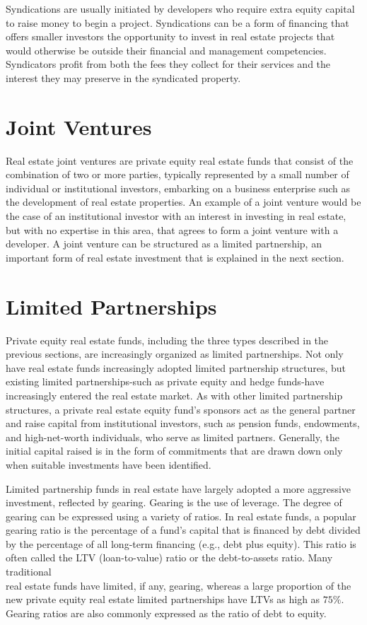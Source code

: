 \documentclass[11pt]{article}
\begin{document}
Syndications are usually initiated by developers who require extra equity capital to raise money to begin a project. Syndications can be a form of financing that offers smaller investors the opportunity to invest in real estate projects that would otherwise be outside their financial and management competencies. Syndicators profit from both the fees they collect for their services and the interest they may preserve in the syndicated property.

\section*{Joint Ventures}
Real estate joint ventures are private equity real estate funds that consist of the combination of two or more parties, typically represented by a small number of individual or institutional investors, embarking on a business enterprise such as the development of real estate properties. An example of a joint venture would be the case of an institutional investor with an interest in investing in real estate, but with no expertise in this area, that agrees to form a joint venture with a developer. A joint venture can be structured as a limited partnership, an important form of real estate investment that is explained in the next section.

\section*{Limited Partnerships}
Private equity real estate funds, including the three types described in the previous sections, are increasingly organized as limited partnerships. Not only have real estate funds increasingly adopted limited partnership structures, but existing limited partnerships-such as private equity and hedge funds-have increasingly entered the real estate market. As with other limited partnership structures, a private real estate equity fund's sponsors act as the general partner and raise capital from institutional investors, such as pension funds, endowments, and high-net-worth individuals, who serve as limited partners. Generally, the initial capital raised is in the form of commitments that are drawn down only when suitable investments have been identified.

Limited partnership funds in real estate have largely adopted a more aggressive investment, reflected by gearing. Gearing is the use of leverage. The degree of gearing can be expressed using a variety of ratios. In real estate funds, a popular gearing ratio is the percentage of a fund's capital that is financed by debt divided by the percentage of all long-term financing (e.g., debt plus equity). This ratio is often called the LTV (loan-to-value) ratio or the debt-to-assets ratio. Many traditional\\
real estate funds have limited, if any, gearing, whereas a large proportion of the new private equity real estate limited partnerships have LTVs as high as $75 \%$. Gearing ratios are also commonly expressed as the ratio of debt to equity.
\end{document}
